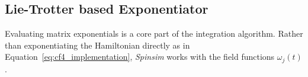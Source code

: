 \documentclass{jors}
\begin{document}
	\subsection{Lie-Trotter based Exponentiator}
		Evaluating matrix exponentials is a core part of the integration algorithm.
		Rather than exponentiating the Hamiltonian directly as in Equation~\eqref{eq:cf4_implementation}, \emph{Spinsim} works with the field functions $ \omega_j(t) $.
\end{document}
